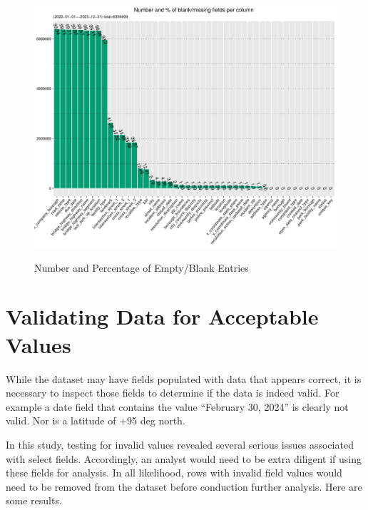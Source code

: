 \documentclass[12pt, titlepage]{article}
\begin{document}
\begin{figure}[tbp]
  \centering
  	\caption{Number and Percentage of Empty/Blank Entries}
	\includegraphics[width=\textwidth]{BlankFields.pdf}
	\label{fig:blank_fields}
\end{figure}



 \section{Validating Data for Acceptable Values}\label{sec:domain}
 While the dataset may have fields populated with data that appears correct, it is necessary to inspect those fields to determine if the data is indeed valid. 
 For example a date field that contains the value ``February 30, 2024'' is clearly not valid. Nor is a latitude of +95 deg north. 
 
 In this study, testing for invalid values revealed several serious issues associated with select fields. Accordingly, an analyst would need to be
extra diligent if using these fields for analysis. In all likelihood, rows with invalid field values would  need to be removed from the
dataset before conduction further analysis. Here are some results.
\end{document}

